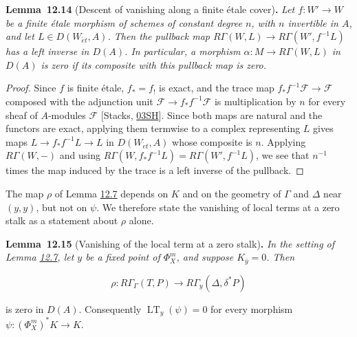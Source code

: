 \documentclass[11pt]{article}
\newenvironment{bpstatement}[2]{\par\addvspace{0.6\baselineskip}\noindent\textbf{#1}#2\textbf{.}\enspace\ignorespaces}
  {\par\addvspace{0.4\baselineskip}}
\newenvironment{bpstatementit}[2]{\begin{bpstatement}{#1}{#2}\itshape\ignorespaces}{\end{bpstatement}}
\begin{document}
\label{bp42}%
\begin{bpstatementit}{Lemma~12.14}{ (Descent of vanishing along a finite étale cover)}
Let \(f:W'\to W\) be a finite étale morphism of schemes of constant degree \(n\), with \(n\) invertible in \(A\), and let \(L\in D(W_{\acute{e}t},A)\). Then the pullback map \(R\Gamma(W,L)\to R\Gamma(W',f^{-1}L)\) has a left inverse in \(D(A)\). In particular, a morphism \(\alpha:M\to R\Gamma(W,L)\) in \(D(A)\) is zero if its composite with this pullback map is zero.
\end{bpstatementit}

\begin{proof}[{Proof}]\label{bp43}%
Since \(f\) is finite étale, \(f_*=f_!\) is exact, and the trace map \(f_*f^{-1}\mathcal F\to\mathcal F\) composed with the adjunction unit \(\mathcal F\to f_*f^{-1}\mathcal F\) is multiplication by \(n\) for every sheaf of \(A\)-modules \(\mathcal F\) [Stacks, \href{https://stacks.math.columbia.edu/tag/03SH}{03SH}]. Since both maps are natural and the functors are exact, applying them termwise to a complex representing \(L\) gives maps \(L\to f_*f^{-1}L\to L\) in \(D(W_{\acute{e}t},A)\) whose composite is \(n\). Applying \(R\Gamma(W,-)\) and using \(R\Gamma(W,f_*f^{-1}L)=R\Gamma(W',f^{-1}L)\), we see that \(n^{-1}\) times the map induced by the trace is a left inverse of the pullback.
\end{proof}

\label{bp44}%
The map \(\rho\) of Lemma \hyperref[bp21]{12.7} depends on \(K\) and on the geometry of \(\Gamma\) and \(\Delta\) near \((y,y)\), but not on \(\psi\). We therefore state the vanishing of local terms at a zero stalk as a statement about \(\rho\) alone.

\label{bp45}%
\begin{bpstatementit}{Lemma~12.15}{ (Vanishing of the local term at a zero stalk)}
In the setting of Lemma \hyperref[bp21]{12.7}, let \(y\) be a fixed point of \(\Phi_X^m\), and suppose \(K_{\bar y}=0\). Then

\[
\rho:R\Gamma_\Gamma(T,P)\longrightarrow R\Gamma_y(\Delta,\delta^*P)
\]

is zero in \(D(A)\). Consequently \(\operatorname{LT}_y(\psi)=0\) for every morphism \(\psi:(\Phi_X^m)^*K\to K\).
\end{bpstatementit}
\end{document}

